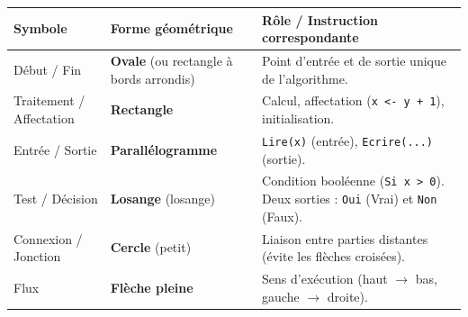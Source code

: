 \documentclass[11pt]{article}
\begin{document}
\begin{propriete}
\begin{center}
\begin{tabularx}{\linewidth}{|l|l|X|}
\hline
\rowcolor{popblueL} \textbf{Symbole} & \textbf{Forme géométrique} & \textbf{Rôle / Instruction correspondante} \\
\hline
Début / Fin & \textbf{Ovale} (ou rectangle à bords arrondis) & Point d'entrée et de sortie unique de l'algorithme. \\
\hline
Traitement / Affectation & \textbf{Rectangle} & Calcul, affectation (\texttt{x <- y + 1}), initialisation. \\
\hline
Entrée / Sortie & \textbf{Parallélogramme} & \texttt{Lire(x)} (entrée), \texttt{Ecrire(...)} (sortie). \\
\hline
Test / Décision & \textbf{Losange} (losange) & Condition booléenne (\texttt{Si x > 0}). Deux sorties : \texttt{Oui} (Vrai) et \texttt{Non} (Faux). \\
\hline
Connexion / Jonction & \textbf{Cercle} (petit) & Liaison entre parties distantes (évite les flèches croisées). \\
\hline
Flux & \textbf{Flèche pleine} & Sens d'exécution (haut $\to$ bas, gauche $\to$ droite). \\
\hline
\end{tabularx}
\end{center}
\end{propriete}
\end{document}
